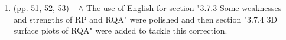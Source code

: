 \documentclass[12pt]{article}
\begin{document}
\begin{enumerate}

\item  (pp. 51, 52, 53)  \_$\wedge$  
	The use of English for section "3.7.3 Some weaknesses and strengths of RP and RQA" 
	were polished  and then section "3.7.4 3D surface plots of RQA" were added to tackle this correction.




%

\end{enumerate}
\end{document}
